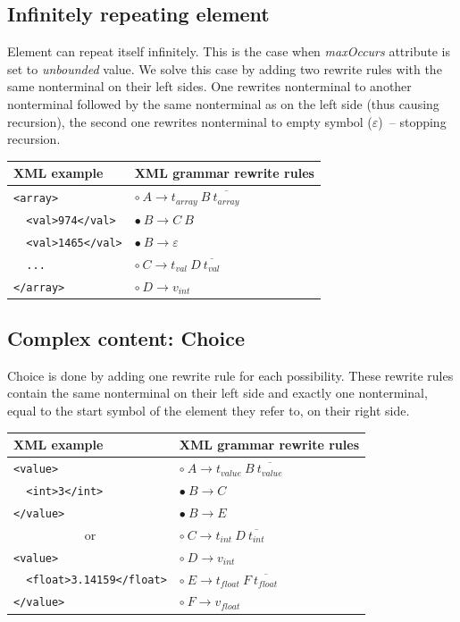 \documentclass[12pt,notitlepage]{report}
\begin{document}
\subsection{Infinitely repeating element}

Element can repeat itself infinitely. This is the case when \textit{maxOccurs} attribute is set to \textit{unbounded} value. We solve this case by adding two rewrite rules with the same nonterminal on their left sides. One rewrites nonterminal to another nonterminal followed by the same nonterminal as on the left side (thus causing recursion), the second one rewrites nonterminal to empty symbol ($\varepsilon$)~-- stopping recursion.

\begin{center}
\setlength{\tabcolsep}{0.5cm}
\renewcommand{\arraystretch}{1.3}
\begin{tabular}{|l|l|}
\hline
XML example & XML grammar rewrite rules \\ \hline
\texttt{<array>} & $\circ~A \rightarrow  t_{array}~B~\overline{t_{array}}$ \\
\texttt{~~<val>974</val>} & $\bullet~B \rightarrow C~B$ \\
\texttt{~~<val>1465</val>} & $\bullet~B \rightarrow \varepsilon$ \\
\texttt{~~...} & $\circ~C \rightarrow t_{val}~D~\overline{t_{val}}$ \\
\texttt{</array>} & $\circ~D \rightarrow v_{int}$ \\ \hline
\end{tabular}
\end{center}

\subsection{Complex content: Choice}

Choice is done by adding one rewrite rule for each possibility. These rewrite rules contain the same nonterminal on their left side and exactly one nonterminal, equal to the start symbol of the element they refer to, on their right side.

\begin{center}
\setlength{\tabcolsep}{0.5cm}
\renewcommand{\arraystretch}{1.3}
\begin{tabular}{|l|l|}
\hline
XML example & XML grammar rewrite rules \\ \hline
\texttt{<value>} & $\circ~A \rightarrow t_{value}~B~\overline{t_{value}}$ \\
\texttt{~~<int>3</int>} & $\bullet~B \rightarrow C$ \\
\texttt{</value>} & $\bullet~B \rightarrow E$ \\
\multicolumn{1}{|c|}{or} & $\circ~C \rightarrow t_{int}~D~\overline{t_{int}}$ \\
\texttt{<value>} & $\circ~D \rightarrow v_{int}$ \\
\texttt{~~<float>3.14159</float>} & $\circ~E \rightarrow t_{float}~F~\overline{t_{float}}$ \\
\texttt{</value>} & $\circ~F \rightarrow v_{float}$ \\ \hline
\end{tabular}
\end{center}
\end{document}
